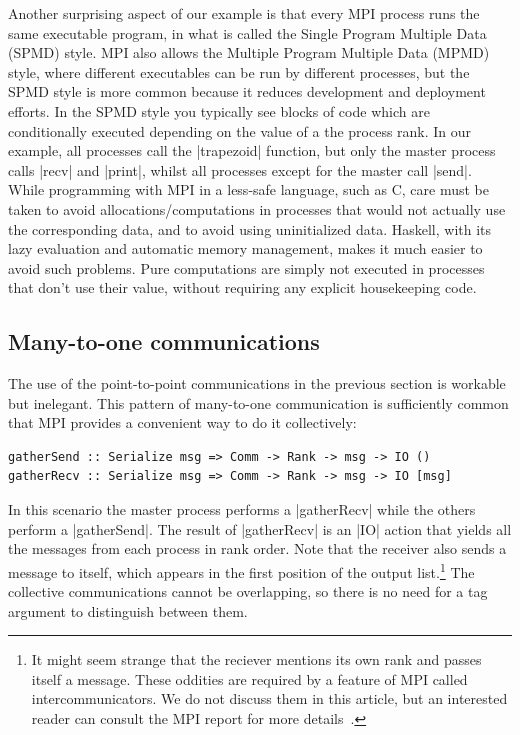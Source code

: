 \documentclass{tmr}
\begin{document}
Another surprising aspect of our example is that every MPI process
runs the same executable program, in what is called the
Single Program Multiple Data (SPMD) style. MPI also allows
the Multiple Program Multiple Data (MPMD) style, where
different executables can be run by different processes, but the SPMD
style is more common because it reduces development and deployment efforts.
In the SPMD style you typically see blocks of code which are
conditionally executed depending on the value of a the process rank.
In our example, all processes call the |trapezoid| function, but
only the master process calls |recv| and |print|, whilst
all processes except for the master call |send|.
While programming with MPI in a less-safe language, such as C, care must
be taken to avoid allocations/computations in processes that would not
actually use the corresponding data, and to avoid using
uninitialized data. Haskell, with its lazy evaluation and automatic
memory management, makes it much easier to avoid such problems.
Pure computations are simply not executed in processes that don't use their
value, without requiring any explicit housekeeping code.

\subsection{Many-to-one communications}

The use of the point-to-point communications in the previous section
is workable but inelegant. This pattern of many-to-one
communication is sufficiently common that MPI provides a
convenient way to do it collectively:
\begin{Verbatim}
gatherSend :: Serialize msg => Comm -> Rank -> msg -> IO ()
gatherRecv :: Serialize msg => Comm -> Rank -> msg -> IO [msg]
\end{Verbatim}
In this scenario the master process performs a
|gatherRecv| while the others perform a |gatherSend|.
The result of |gatherRecv| is an |IO| action that yields all
the messages from each process in rank order. Note that
the receiver also sends a message to itself, which appears in
the first position of the output list.\footnote{It might seem
strange that the reciever mentions its own rank and passes itself
a message. These oddities are required by a feature of
MPI called intercommunicators. We do not discuss them in this
article, but an interested reader can consult the MPI report
for more details~\cite{mpi-report}.} The collective communications
cannot be overlapping, so there is no need for a tag argument to
distinguish between them.
\end{document}
